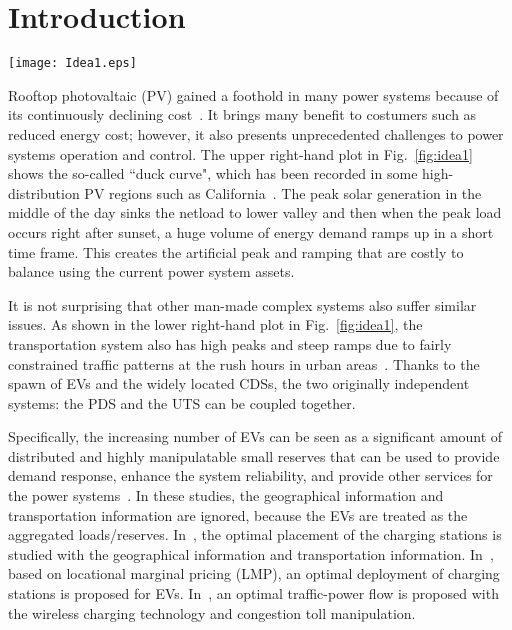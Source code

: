 \documentclass[final]{IEEEtran}
\begin{document}
\section{Introduction}\label{sec:introduction}
\begin{figure*}[!t]
	\begin{center}
		\texttt{[image: Idea1.eps]}
		\caption{The main idea and the bi-peak and bi-ramp problems in a power distribution system and a transportation system in a urban area.}\label{fig:idea1}
	\end{center}
\end{figure*}

Rooftop photovaltaic (PV) gained a foothold in many power systems because of its continuously declining cost~\cite{chen12g2015seeds,cui2015sol12ar,gu2016kno12wledge}. It brings many benefit to costumers such as reduced energy cost; however, it also presents unprecedented challenges to power systems operation and control. The upper right-hand plot in Fig.~\ref{fig:idea1} shows the so-called ``duck curve", which has been recorded in some high-distribution PV regions such as California~\cite{katsigiann123is2010novel, tian2013re1view, connolly2010review}. The peak solar generation in the middle of the day sinks the netload to lower valley and then when the peak load occurs right after sunset, a huge volume of energy demand ramps up in a short time frame. This creates the artificial peak and ramping that are costly to balance using the current power system assets. 

It is not surprising that other man-made complex systems also suffer similar issues. As shown in the lower right-hand plot in Fig.~\ref{fig:idea1}, the transportation system also has high peaks and steep ramps due to fairly constrained traffic patterns at the rush hours in urban areas~\cite{gonzal65es2013evening,cheng2015urb1an,huang2017para123meterized}. Thanks to the spawn of EVs and the widely located CDSs, the two originally independent systems: the PDS and the UTS can be coupled together.

Specifically, the increasing number of EVs can be seen as a significant amount of distributed and highly manipulatable small reserves that can be used to provide demand response, enhance the system reliability, and provide other services for the power systems~\cite{fol1ey2013impacts, liu2012asse234ssment, wu2012loa234d,sortomme2012opt234imal,synchro2015jiangf234s,heymans2014econo123mic,geng2017learn89ing}. In these studies, the geographical information and transportation information are ignored, because the EVs are treated as the aggregated loads/reserves. In~\cite{sadeghi2014opt234imal}, the optimal placement of the charging stations is studied with the geographical information and transportation information. In~\cite{he2013op234timal}, based on locational marginal pricing (LMP), an optimal deployment of charging stations is proposed for EVs. In~\cite{wei2017opt456imal}, an optimal traffic-power flow is proposed with the wireless charging technology and congestion toll manipulation.
\end{document}
